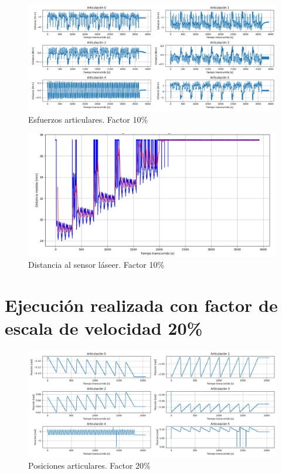 \begin{figure}[H]
    \centering
    \includegraphics[scale=0.30]{figuras/ensayo_control_velocidad/esfuerzos 0.1.png}
    \caption{Esfuerzos articulares. Factor 10\%}
    \label{fig:esfuerzos articulares 0.1}
\end{figure}

\begin{figure}[H]
    \centering
    \includegraphics[scale=0.30]{figuras/ensayo_control_velocidad/laser 0.1.png}
    \caption{Distancia al sensor láseer. Factor 10\%}
    \label{fig:laser 0.1}
\end{figure}

\section{Ejecución realizada con factor de escala de velocidad 20\%}

\begin{figure}[H]
    \centering
    \includegraphics[scale=0.30]{figuras/ensayo_control_velocidad/posiciones articulares 0.2.png}
    \caption{Posiciones articulares. Factor 20\%}
    \label{fig:posiciones articulares 0.2}
\end{figure}

